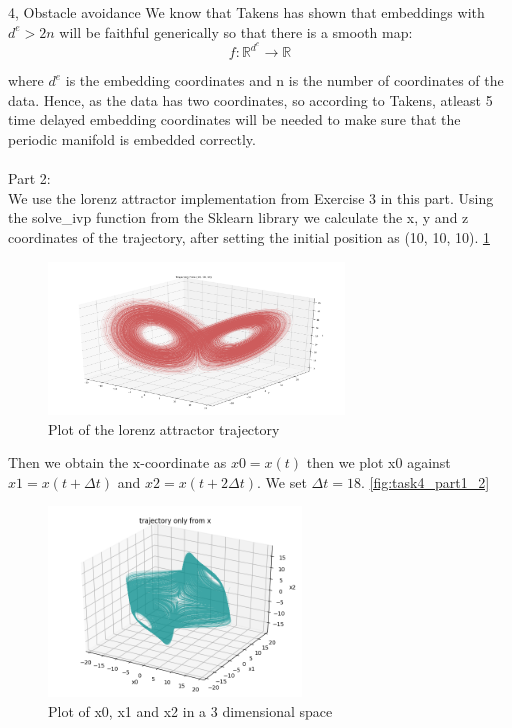 \documentclass[10pt,a4paper]{article}
\begin{document}
\begin{task}{4, Obstacle avoidance}
We know that Takens has shown that embeddings with $d^{e} > 2n$ will be faithful generically so that there is a smooth map:
\begin{equation*}
f : \mathbb{R}^{d^{e}} \rightarrow \mathbb{R}
\end{equation*}

where $d^{e}$ is the embedding coordinates and n is the number of coordinates of the data. Hence, as the data has two coordinates, so according to Takens, atleast 5 time delayed embedding coordinates will be needed to make sure that the periodic manifold is embedded correctly. \\\\

Part 2: \\
We use the lorenz attractor implementation from Exercise 3 in this part. Using the solve\_ivp function from the Sklearn library we calculate the x, y and z coordinates of the trajectory, after setting the initial position as (10, 10, 10). \ref{fig:task4_part2_1}

\begin{figure}[H]
\centering
\includegraphics[width=0.7\textwidth]{../plots/task4_part2_1.png}
\caption{Plot of the lorenz attractor trajectory}
\label{fig:task4_part2_1}
\end{figure}

Then we obtain the x-coordinate as $x0 = x(t)$ then we plot x0 against $x1 = x(t + \Delta t)$ and $x2 = x(t + 2\Delta t)$. We set $\Delta t = 18$. \ref{fig:task4_part1_2}

\begin{figure}[H]
\centering
\includegraphics[width=0.6\textwidth]{../plots/task4_part2_2.png}
\caption{Plot of x0, x1 and x2 in a 3 dimensional space}
\label{fig:task4_part2_2}
\end{figure}


\end{task}
\end{document}
